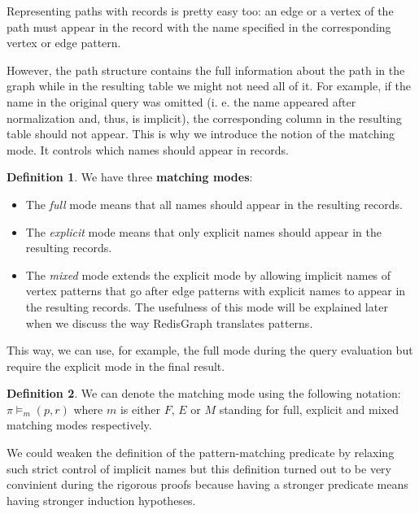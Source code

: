 \documentclass[14pt]{constructor-thesis}
\theoremstyle{definition}
\newtheorem{definition}{Definition}
\begin{document}
Representing paths with records is pretty easy too: an edge or a vertex of the path must appear in the record with the name specified in the corresponding vertex or edge pattern.

However, the path structure contains the full information about the path in the graph while in the resulting table we might not need all of it. For example, if the name in the original query was omitted (i. e. the name appeared after normalization and, thus, is implicit), the corresponding column in the resulting table should not appear. This is why we introduce the notion of the matching mode. It controls which names should appear in records.

\begin{definition}
  We have three \textbf{matching modes}:
  \begin{itemize}
    \item The \textit{full} mode means that all names should appear in the resulting records.
    \item The \textit{explicit} mode means that only explicit names should appear in the resulting records.
    \item The \textit{mixed} mode extends the explicit mode by allowing implicit names of vertex patterns that go after edge patterns with explicit names to appear in the resulting records. The usefulness of this mode will be explained later when we discuss the way RedisGraph translates patterns.
  \end{itemize} 
\end{definition}

This way, we can use, for example, the full mode during the query evaluation but require the explicit mode in the final result.

\begin{definition}
  We can denote the matching mode using the following notation:
  $ \pi \models_m (p, r) $
  where $m$ is either $F$, $E$ or $M$ standing for full, explicit and mixed matching modes respectively.
\end{definition}

We could weaken the definition of the pattern-matching predicate by relaxing such strict control of implicit names but this definition turned out to be very convinient during the rigorous proofs because having a stronger predicate means having stronger induction hypotheses.
\end{document}
